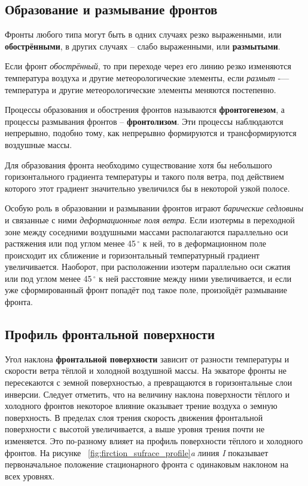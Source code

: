 \documentclass[a4paper, 12pt, twoside, final, book, russian, fittopage, cyremdash, openright]{ncc}
\newcommand{\gr}{\ensuremath{\,^\circ}\xspace}
\begin{document}
\subsection{Образование и размывание фронтов}
\label{sec:makes_fronts}

Фронты любого типа могут быть в одних случаях резко выраженными, или
\textbf{обострёнными}, в других случаях \--- слабо
выраженными, или \textbf{размытыми}.

Если фронт \textit{обострённый}, то при переходе через его линию резко
изменяются температура воздуха и другие метеорологические элементы,
если \textit{размыт} \--— температура и другие метеорологические
элементы меняются постепенно.

Процессы образования и обострения фронтов называются
\textbf{фронтогенезом}, а процессы размывания
фронтов \--- \textbf{фронтолизом}. Эти процессы
наблюдаются непрерывно, подобно тому, как непрерывно формируются и
трансформируются воздушные массы.

Для образования фронта необходимо существование хотя бы небольшого
горизонтального градиента температуры и такого поля ветра, под
действием которого этот градиент значительно увеличился бы в некоторой
узкой полосе.

Особую роль в образовании и размывании фронтов играют \textit{барические
седловины} и связанные с ними \textit{деформационные поля ветра}. Если изотермы
в переходной зоне между соседними воздушными массами располагаются
параллельно оси растяжения или под углом менее 45\gr{} к ней, то в
деформационном поле происходит их сближение и горизонтальный
температурный градиент увеличивается. Наоборот, при расположении
изотерм параллельно оси сжатия или под углом менее 45\gr{} к ней
расстояние между ними увеличивается, и если уже сформированный фронт
попадёт под такое поле, произойдёт размывание фронта.

\subsection{Профиль фронтальной поверхности}
\label{sec:frontal_surface_profile}

Угол наклона \textbf{фронтальной поверхности} зависит от разности
температуры и скорости ветра тёплой и холодной воздушной массы. На
экваторе фронты не пересекаются с земной поверхностью, а превращаются
в горизонтальные слои инверсии. Следует отметить, что на величину
наклона поверхности тёплого и холодного фронтов некоторое влияние
оказывает трение воздуха о земную поверхность. В пределах слоя трения
скорость движения фронтальной поверхности с высотой увеличивается, а
выше уровня трения почти не изменяется. Это по-разному влияет на
профиль поверхности тёплого и холодного фронтов. На рисунке
~\ref{fig:firction_sufrace_profile}\textit{a} линия \textit{I}
показывает первоначальное положение стационарного фронта с одинаковым
наклоном на всех уровнях.
\end{document}

